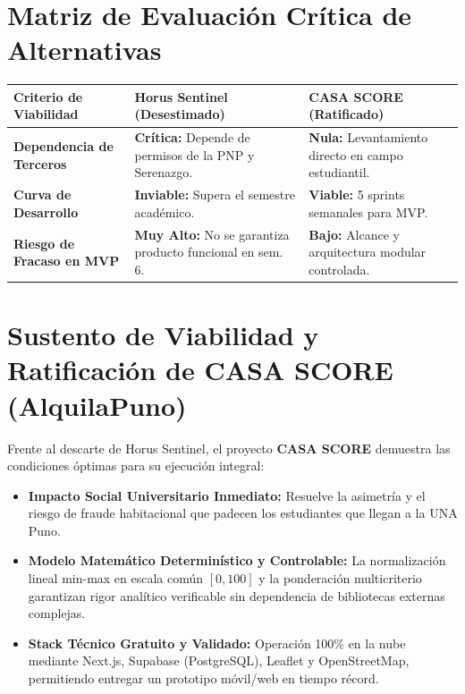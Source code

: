 \documentclass[11pt,a4paper]{article}
\begin{document}
\section{Matriz de Evaluación Crítica de Alternativas}
\vspace{0.1cm}
\noindent\begin{tabularx}{\textwidth}{p{4.2cm} X X}
\toprule
\textbf{Criterio de Viabilidad} & \textbf{Horus Sentinel (Desestimado)} & \textbf{CASA SCORE (Ratificado)} \\
\midrule
\textbf{Dependencia de Terceros} & \textbf{Crítica:} Depende de permisos de la PNP y Serenazgo. & \textbf{Nula:} Levantamiento directo en campo estudiantil. \\
\addlinespace[2pt]
\textbf{Curva de Desarrollo} & \textbf{Inviable:} Supera el semestre académico. & \textbf{Viable:} 5 sprints semanales para MVP. \\
\addlinespace[2pt]
\textbf{Riesgo de Fracaso en MVP} & \textbf{Muy Alto:} No se garantiza producto funcional en sem. 6. & \textbf{Bajo:} Alcance y arquitectura modular controlada. \\
\bottomrule
\end{tabularx}

\clearpage


\section{Sustento de Viabilidad y Ratificación de CASA SCORE (AlquilaPuno)}
Frente al descarte de Horus Sentinel, el proyecto \textbf{CASA SCORE} demuestra las condiciones óptimas para su ejecución integral:
\begin{itemize}[leftmargin=*]
    \item \textbf{Impacto Social Universitario Inmediato:} Resuelve la asimetría y el riesgo de fraude habitacional que padecen los estudiantes que llegan a la UNA Puno.
    \item \textbf{Modelo Matemático Determinístico y Controlable:} La normalización lineal min-max en escala común $[0, 100]$ y la ponderación multicriterio garantizan rigor analítico verificable sin dependencia de bibliotecas externas complejas.
    \item \textbf{Stack Técnico Gratuito y Validado:} Operación 100\% en la nube mediante Next.js, Supabase (PostgreSQL), Leaflet y OpenStreetMap, permitiendo entregar un prototipo móvil/web en tiempo récord.
\end{itemize}
\end{document}
